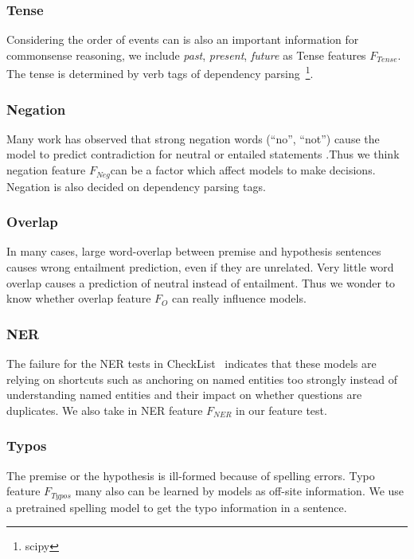 \subsubsection{Tense}

Considering the order of events can is also an 
important information for commonsense reasoning, we include 
\textit{past}, \textit{present}, \textit{future} as Tense features $F_{Tense}$. 
The tense is determined by verb tags of dependency parsing~\footnote{scipy}.

\subsubsection{Negation}

Many work has observed that 
strong negation words (“no”, “not”) cause the model to predict contradiction for
neutral or entailed statements .Thus we think negation feature $F_{Neg}$can be a factor which affect models 
to make decisions. Negation is also decided on dependency parsing tags.

\subsubsection{Overlap}

In many cases, large word-overlap between premise and hypothesis sentences causes
wrong entailment prediction, even if they are unrelated. 
Very little word overlap causes a prediction
of neutral instead of entailment. Thus we wonder to 
know whether overlap feature $F_{O}$ can 
really influence models.

\subsubsection{NER}

The failure for the NER tests in CheckList~\cite{}
indicates that these models are relying on shortcuts
such as anchoring on named entities too strongly
instead of understanding named entities and their
impact on whether questions are duplicates. We also 
take in NER feature $F_{NER}$ in our feature test.

\subsubsection{Typos}

The premise or the hypothesis is ill-formed because of spelling errors. 
Typo feature $F_{Typos}$ many also can be learned by models as off-site information. 
We use a pretrained spelling model to get the typo information in a 
sentence. 

